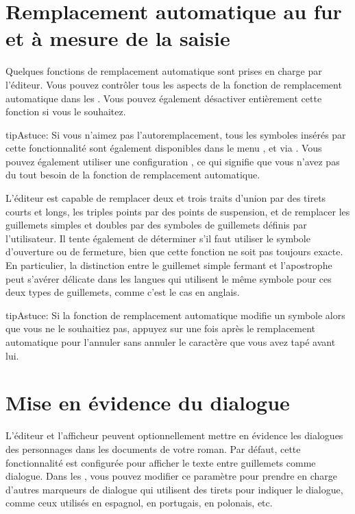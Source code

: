 \documentclass[a4paper,11pt,french]{sphinxmanual}
\begin{document}
\section{Remplacement automatique au fur et à mesure de la saisie}
\label{\detokenize{usage_writing:auto-replace-as-you-type}}\label{\detokenize{usage_writing:a-ui-edit-auto}}
\sphinxAtStartPar
Quelques fonctions de remplacement automatique sont prises en charge par l’éditeur. Vous pouvez contrôler tous les aspects de la fonction de remplacement automatique dans les . Vous pouvez également désactiver entièrement cette fonction si vous le souhaitez.

\begin{sphinxadmonition}{tip}{Astuce:}
\sphinxAtStartPar
Si vous n’aimez pas l’auto\sphinxhyphen{}remplacement, tous les symboles insérés par cette fonctionnalité sont également disponibles dans le menu , et via {\hyperref[\detokenize{usage_shortcuts:a-kb-ins}]{}}. Vous pouvez également utiliser une configuration , ce qui signifie que vous n’avez pas du tout besoin de la fonction de remplacement automatique.
\end{sphinxadmonition}

\sphinxAtStartPar
L’éditeur est capable de remplacer deux et trois traits d’union par des tirets courts et longs, les triples points par des points de suspension, et de remplacer les guillemets simples et doubles par des symboles de guillemets définis par l’utilisateur. Il tente également de déterminer s’il faut utiliser le symbole d’ouverture ou de fermeture, bien que cette fonction ne soit pas toujours exacte. En particulier, la distinction entre le guillemet simple fermant et l’apostrophe peut s’avérer délicate dans les langues qui utilisent le même symbole pour ces deux types de guillemets, comme c’est le cas en anglais.

\begin{sphinxadmonition}{tip}{Astuce:}
\sphinxAtStartPar
Si la fonction de remplacement automatique modifie un symbole alors que vous ne le souhaitiez pas, appuyez sur  une fois après le remplacement automatique pour l’annuler sans annuler le caractère que vous avez tapé avant lui.
\end{sphinxadmonition}


\section{Mise en évidence du dialogue}
\label{\detokenize{usage_writing:dialogue-highlighting}}\label{\detokenize{usage_writing:a-ui-edit-dialogue}}
\sphinxAtStartPar
L’éditeur et l’afficheur peuvent optionnellement mettre en évidence les dialogues des personnages dans les documents de votre roman. Par défaut, cette fonctionnalité est configurée pour afficher le texte entre guillemets comme dialogue. Dans les , vous pouvez modifier ce paramètre pour prendre en charge d’autres marqueurs de dialogue qui utilisent des tirets pour indiquer le dialogue, comme ceux utilisés en espagnol, en portugais, en polonais, etc.
\end{document}
